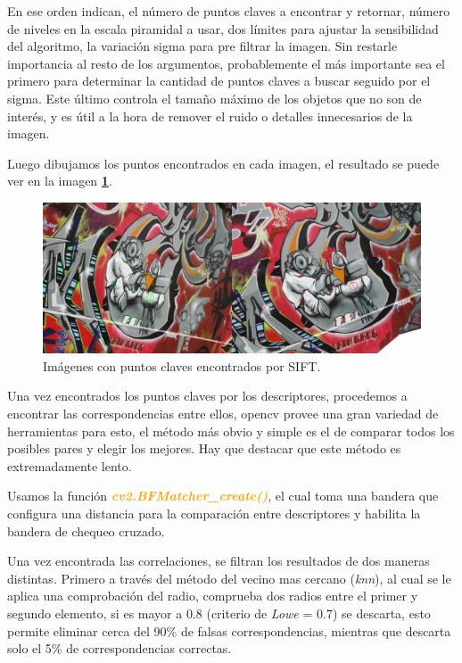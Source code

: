 \documentclass[11pt, a4paper]{article}
\begin{document}
	En ese orden indican, el número de puntos claves a encontrar y retornar, número de niveles en la escala piramidal a usar, dos límites para ajustar la sensibilidad del algoritmo, la variación sigma para pre filtrar la imagen. Sin restarle importancia al resto de los argumentos, probablemente el más importante sea el primero para determinar la cantidad de puntos claves a buscar seguido por el sigma. Este último controla el tamaño máximo de los objetos que no son de interés, y es útil a la hora de remover el ruido o detalles innecesarios de la imagen. 
	
	

	Luego dibujamos los puntos encontrados en cada imagen, el resultado se puede ver en la imagen \textcolor{blue}{\textbf{\ref{fig:sift_kp}}}.
	

	\begin{figure}[H]
		\centering
		\includegraphics[width=\textwidth]{Imagenes/sift_kp.png}
		\caption{Imágenes con puntos claves encontrados por SIFT.}
		\label{fig:sift_kp}
	\end{figure} 

	Una vez encontrados los puntos claves por los descriptores, procedemos a encontrar las correspondencias entre ellos, opencv provee una gran variedad de herramientas para esto, el método más obvio y simple es el de comparar todos los posibles pares y elegir los mejores. Hay que destacar que este método es extremadamente lento. 

	Usamos la función \textcolor{orange}{\textbf{\textit{cv2.BFMatcher\_create()}}}, el cual toma una bandera que configura una distancia para la comparación entre descriptores y habilita la bandera de chequeo cruzado.

	

		Una vez encontrada las correlaciones, se filtran los resultados de dos maneras distintas. Primero a través del método del vecino mas cercano (\textit{knn}), al cual se le aplica una comprobación del radio, comprueba dos radios entre el primer y segundo elemento, si es mayor a 0.8 (criterio de \textit{Lowe} = 0.7) se descarta, esto permite eliminar cerca del 90\% de falsas correspondencias, mientras que descarta solo el 5\% de correspondencias correctas.
\end{document}
